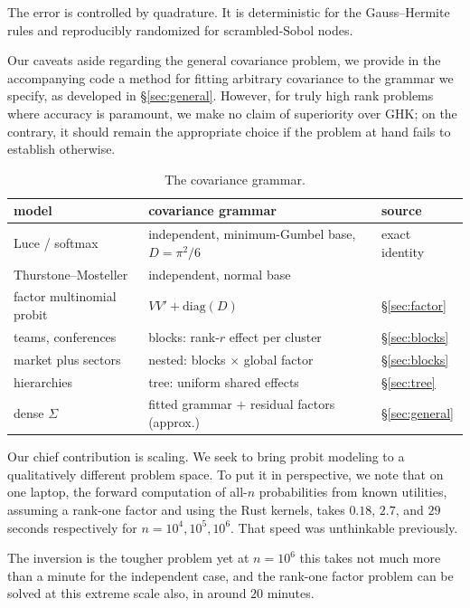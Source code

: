 \documentclass[11pt]{article}
\begin{document}
The error is controlled by quadrature. It is deterministic for the Gauss--Hermite rules and reproducibly randomized for
scrambled-Sobol nodes.

Our caveats aside regarding the general covariance problem, we provide in the accompanying code a method for fitting arbitrary covariance to the grammar we specify, as developed in \S\ref{sec:general}. However, for truly high rank problems where accuracy is paramount, we make no claim of superiority over GHK; on the contrary, it should remain the appropriate choice if the problem at hand fails to establish otherwise.

\begin{table}[h]\centering\small
\begin{tabular}{lll}
\toprule
model & covariance grammar & source \\
\midrule
Luce / softmax & independent, minimum-Gumbel base, $D=\pi^2/6$ & exact identity \\
Thurstone--Mosteller \citep{mosteller1951} & independent, normal base & \citet{cotton2021} \\
factor multinomial probit & $VV'+\mathrm{diag}(D)$ & \S\ref{sec:factor} \\
teams, conferences & blocks: rank-$r$ effect per cluster & \S\ref{sec:blocks} \\
market plus sectors & nested: blocks $\times$ global factor & \S\ref{sec:blocks} \\
hierarchies & tree: uniform shared effects & \S\ref{sec:tree} \\
dense $\Sigma$ & fitted grammar $+$ residual factors (approx.) & \S\ref{sec:general} \\
\bottomrule
\end{tabular}
\caption{The covariance grammar.}\label{tab:grammar}
\end{table}

Our chief contribution is scaling. We seek to bring probit modeling to a qualitatively different problem space.  To put it in perspective, we note that on one laptop, the forward computation of all-$n$ probabilities from known utilities, assuming a rank-one factor and using the Rust kernels, takes $0.18$, $2.7$, and $29$ seconds respectively for $n=10^{4},10^{5},10^{6}$. That speed was unthinkable previously.

The inversion is the tougher problem yet at $n=10^{6}$ this takes not much more than a minute for the independent case, and the rank-one factor problem can be solved at this
extreme scale also, in around $20$ minutes.
\end{document}
